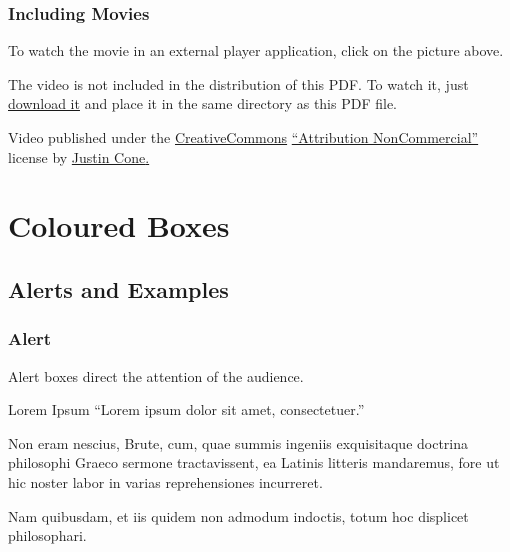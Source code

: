 \documentclass{beamer}
\begin{document}
\begin{frame}
  \frametitle{Including Movies}


  \begin{center}
  \end{center}

  {\small
  To watch the movie in an external player application, click on the picture above.%

  The video is not included in the distribution of this PDF. To watch it, just \href{http://story.idi.ntnu.no/~cassens/download/latex/beamer/Building_On_The_Past.mpg}{\alert{download it}} and place it in the same directory as this PDF file.
  }

  {\tiny Video published under the \href{http://creativecommons.org/}{\alert{CreativeCommons}} \href{http://creativecommons.org/licenses/by-nc/1.0/}{\alert{``Attribution NonCommercial''}} license by \href{http://justincone.com/main.html}{\alert{Justin Cone}.}}

\end{frame}

\section{Coloured Boxes}

\subsection{Alerts and Examples}

\begin{frame}
  \frametitle{Alert}

  Alert boxes direct the attention of the audience.

  \begin{alertblock}{Lorem Ipsum}
    ``Lorem ipsum dolor sit amet, consectetuer.''
  \end{alertblock}

  Non eram nescius, Brute, cum, quae summis ingeniis exquisitaque doctrina philosophi Graeco sermone tractavissent, ea Latinis litteris mandaremus, fore ut hic noster labor in varias reprehensiones incurreret.

  Nam quibusdam, et iis quidem non admodum indoctis, totum hoc displicet philosophari.
\end{frame}
\end{document}
